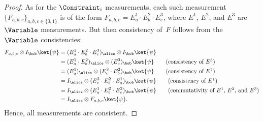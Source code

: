 \begin{proof}
  As for the $\Constraint_i$ measurements, each such measurement $\{F_{a, b,
    c}\}_{a, b, c \in \{0, 1\}}$ is of the form $F_{a, b, c} = E^1_a \cdot E^2_b
  \cdot E^3_c$, where $E^1$, $E^2$, and $E^3$ are $\Variable$ measurements.
  But then consistency of~$F$ follows from the~$\Variable$ consistencies:
  \begin{align*}
  F_{a, b, c} \otimes I_{\bob} \ket{\psi}
 & = (E^1_a \cdot E^2_b \cdot E^3_c)_{\alice} \otimes I_{\bob} \ket{\psi}\\
 & = (E^1_a \cdot E^2_b)_{\alice} \otimes (E^3_c)_{\bob} \ket{\psi} \tag{consistency of $E^3$}\\
 &   = (E^1_a)_{\alice} \otimes (E^3_c \cdot E^2_b)_{\bob} \ket{\psi}\tag{consistency of $E^2$}\\
 &       = I_{\alice} \otimes (E^3_c \cdot E^2_b \cdot E^1_a)_{\bob} \ket{\psi}\tag{consistency of $E^1$}\\
 &       = I_{\alice} \otimes (E^1_a \cdot E^2_b \cdot E^2_c)_{\bob} \ket{\psi}\tag{commutativity of $E^1$, $E^2$, and $E^3$}\\
 &               = I_{\alice} \otimes F_{a, b,c} \ket{\psi}.
  \end{align*}
  Hence, all measurements are consistent.
  

\end{proof}
